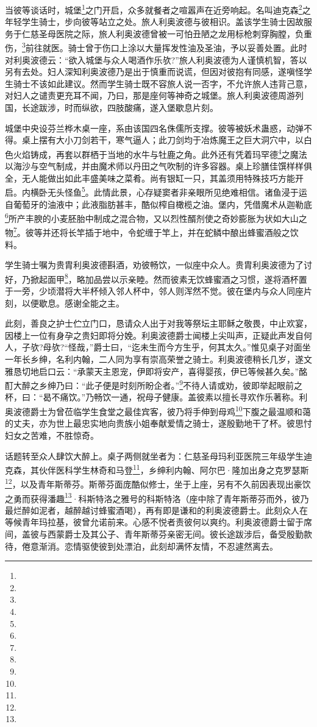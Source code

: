 \par 当彼等谈话时，城堡\footnote{}之门开启，众多就餐者之喧嚣声在近旁响起。名叫迪克森\footnote{}之年轻学生骑士，步向彼等站立之处。旅人利奥波德与彼相识。盖该学生骑士因故服务于仁慈圣母医院之际，旅人利奥波德曾被一可怕丑陋之龙用标枪刺穿胸膛，负重伤，\footnote{}前往就医。骑士曾于伤口上涂以大量挥发性油及圣油，予以妥善处置。此时对利奥波德云：“欲入城堡与众人喝酒作乐欤?”旅人利奥波德为人谨慎机智，答以另有去处。妇人深知利奥波德乃是出于慎重而说谎，但因对彼抱有同感，遂嗔怪学生骑士不该如此建议。然而学生骑士既不容旅人说一否字，不允许旅人违背己意，对妇人之谴责更充耳不闻，乃曰，那是座何等神奇之城堡。旅人利奥波德周游列国，长途跋涉，时而纵欲，四肢酸痛，遂入堡歇息片刻。
\par 城堡中央设芬兰桦木桌一座，系由该国四名侏儒所支撑。彼等被妖术蛊惑，动弹不得。桌上摆有大小刀剑若干，寒气逼人；此刀剑均于冶炼魔王之巨大洞穴中，以白色火焰铸成，再套以群栖于当地的水牛与牡鹿之角。此外还有凭着玛罕德\footnote{}之魔法以海沙与空气制成，并由魔术师以丹田之气吹制的许多容器。桌上珍膳佳馔样样俱全，无人能做出如此丰盛美味之菜肴。尚有银缸一只，其盖须用特殊技巧方能开启。内横卧无头怪鱼\footnote{}。此情此景，心存疑窦者非亲眼所见绝难相信。诸鱼浸于运自葡萄牙的油液中；此液脂肪甚丰，酷似榨自橄榄之油。堡内，凭借魔术从迦勒底\footnote{}所产丰腴的小麦胚胎中制成之混合物，又以烈性醑剂使之奇妙膨胀为状如大山之物\footnote{}。彼等并还将长竿插于地中，令蛇缠于竿上，并在蛇鳞中酿出蜂蜜酒般之饮料。
\par 学生骑士嘱为贵胄利奥波德斟酒，劝彼畅饮，一似座中众人。贵胄利奥波德为了讨好，乃掀起面甲\footnote{}，略加品尝以示亲睦。然而彼素无饮蜂蜜酒之习惯，遂将酒杯置于一旁，少顷潜将大半杯倾入邻人杯中，邻人则浑然不觉。彼在堡内与众人同座片刻，以便歇息。感谢全能之主。
\par 此刻，善良之护士伫立门口，恳请众人出于对我等祭坛主耶稣之敬畏，中止欢宴，因楼上一位有身孕之贵妇即将分娩。利奥波德爵士闻楼上尖叫声，正疑此声发自何人，子欤?母欤?“怪哉，”爵士曰，“迄未生而今方生乎，何其太久。”惟见桌子对面坐一年长乡绅，名利内翰，二人同为享有崇高荣誉之骑士。利奥波德稍长几岁，遂文雅恳切地启口云：“承蒙天主恩宠，伊即将安产，喜得婴孩，伊已等候甚久矣。”酩酊大醉之乡绅乃曰：“此子便是时刻所盼企者。”\footnote{}不待人请或劝，彼即举起眼前之杯，曰：“曷不痛饮。”乃畅饮一通，祝母子健康。盖彼素以擅长寻欢作乐著称。利奥波德爵士为曾莅临学生食堂之最佳宾客，彼乃将手伸到母鸡\footnote{}下腹之最温顺和蔼的丈夫，亦为世上最忠实地向贵族小姐奉献爱情之骑士，遂殷勤地干了杯。彼思忖妇女之苦难，不胜惊奇。
\par 话题转至众人肆饮大醉上。桌子两侧就坐者为：仁慈圣母玛利亚医院三年级学生迪克森，其伙伴医科学生林奇和马登\footnote{}，乡绅利内翰、阿尔巴·隆加出身之克罗瑟斯\footnote{}，以及青年斯蒂芬。斯蒂芬面庞酷似修士，坐于上座，另有不久前因表现出豪饮之勇而获得潘趣\footnote{}·科斯特洛之雅号的科斯特洛（座中除了青年斯蒂芬而外，彼乃最烂醉如泥者，越醉越讨蜂蜜酒喝），再有即是谦和的利奥波德爵士。此刻众人在等候青年玛拉基，彼曾允诺前来。心感不悦者责彼何以爽约。利奥波德爵士留于席间，盖彼与西蒙爵士及其公子、青年斯蒂芬亲密无间。彼长途跋涉后，备受殷勤款待，倦意渐消。恋情驱使彼到处漂泊，此刻却满怀友情，不忍遽然离去。
